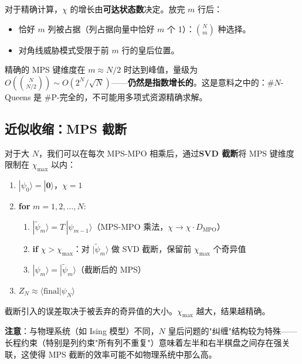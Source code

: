 \documentclass[12pt,a4paper]{ctexart}
\begin{document}
对于精确计算，$\chi$ 的增长由\textbf{可达状态数}决定。放完 $m$ 行后：
\begin{itemize}
    \item 恰好 $m$ 列被占据（列占据向量中恰好 $m$ 个 1）：$\binom{N}{m}$ 种选择。
    \item 对角线威胁模式受限于前 $m$ 行的皇后位置。
\end{itemize}

精确的 MPS 键维度在 $m \approx N/2$ 时达到峰值，量级为 $O\!\left(\binom{N}{N/2}\right) \sim O(2^N/\sqrt{N})$——\textbf{仍然是指数增长的}。这是意料之中的：\#$N$-Queens 是 \#P-完全的，不可能用多项式资源精确求解。

\subsection{近似收缩：MPS 截断}

对于大 $N$，我们可以在每次 MPS-MPO 相乘后，通过\textbf{SVD 截断}将 MPS 键维度限制在 $\chi_{\max}$ 以内：

\begin{tcolorbox}[colback=yellow!5, colframe=orange!60!black, title=\textbf{近似收缩算法}]
\begin{enumerate}[leftmargin=*]
    \item $|\psi_0\rangle = |\mathbf{0}\rangle$，$\chi = 1$
    \item \textbf{for} $m = 1, 2, \ldots, N$:
    \begin{enumerate}
        \item $|\tilde{\psi}_m\rangle = T \, |\psi_{m-1}\rangle$（MPS-MPO 乘法，$\chi \to \chi \cdot D_{\text{MPO}}$）
        \item \textbf{if} $\chi > \chi_{\max}$：对 $|\tilde{\psi}_m\rangle$ 做 SVD 截断，保留前 $\chi_{\max}$ 个奇异值
        \item $|\psi_m\rangle = |\tilde{\psi}_m\rangle$（截断后的 MPS）
    \end{enumerate}
    \item $Z_N \approx \langle \text{final}|\psi_N\rangle$
\end{enumerate}
\end{tcolorbox}

截断引入的误差取决于被丢弃的奇异值的大小。$\chi_{\max}$ 越大，结果越精确。

\textbf{注意}：与物理系统（如 Ising 模型）不同，$N$ 皇后问题的"纠缠"结构较为特殊——长程约束（特别是列约束"所有列不重复"）意味着左半和右半棋盘之间存在强关联，这使得 MPS 截断的效率可能不如物理系统中那么高。
\end{document}
